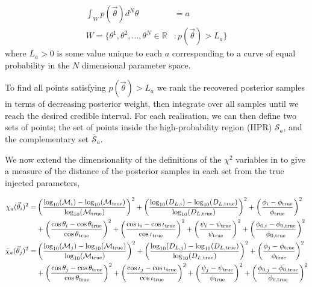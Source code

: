 \documentclass[prd,showpacs,nofootinbib]{revtex4}
\begin{document}
\begin{align}
\int_W p(\vec\theta )d^N\theta &= a \\\nonumber
W = \{\theta^1,\theta^2,\ldots,\theta^N\in\mathbb{R} &: p(\vec\theta )>L_a\}
\end{align}
where $L_a>0$ is some value unique to each $a$ corresponding to a curve of equal probability in the $N$ dimensional parameter space.

To find all points satisfying $p(\vec\theta )>L_a$  we rank the recovered posterior samples in terms of decreasing posterior weight, then integrate over all samples until we reach the desired credible interval. For each realisation, we can then define two sets of points; the set of points inside the high-probability region (HPR) $\mathcal{S}_a$, and the complementary set $\mathcal{\bar S}_a$.

We now extend the dimensionality of the definitions of the $\chi^2$ variables in \citep{ellis-first-order} to give a measure of the distance of the posterior samples in each set from the true injected parameters,

\begin{align}
\chi_a(\vec\theta_i)^2 =& \left(\frac{\log_{10}(\mathcal{M}_i)-\log_{10}(\mathcal{M}_{\rm true})}{\log_{10}(\mathcal{M}_{\rm true})}\right)^2 + \left(\frac{\log_{10}(D_{L,i})-\log_{10}(D_{L,\rm true})}{\log_{10}(D_{L,\rm true})}\right)^2 + \left(\frac{\phi_i-\phi_{\rm true}}{\phi_{\rm true}}\right)^2 \\\nonumber 
&+ \left(\frac{\cos\theta_i-\cos\theta_{\rm true}}{\cos\theta_{\rm true}}\right)^2 + \left(\frac{\cos\iota_i-\cos\iota_{\rm true}}{\cos\iota_{\rm true}}\right)^2 + \left(\frac{\psi_i-\psi_{\rm true}}{\psi_{\rm true}}\right)^2 + \left(\frac{\phi_{0,i}-\phi_{0,\rm true}}{\phi_{0,\rm true}}\right)^2 \\\nonumber
\bar\chi_a(\vec\theta_j)^2 =& \left(\frac{\log_{10}(\mathcal{M}_j)-\log_{10}(\mathcal{M}_{\rm true})}{\log_{10}(\mathcal{M}_{\rm true})}\right)^2 + \left(\frac{\log_{10}(D_{L,j})-\log_{10}(D_{L,\rm true})}{\log_{10}(D_{L,\rm true})}\right)^2 + \left(\frac{\phi_j-\phi_{\rm true}}{\phi_{\rm true}}\right)^2 \\\nonumber 
&+ \left(\frac{\cos\theta_j-\cos\theta_{\rm true}}{\cos\theta_{\rm true}}\right)^2 + \left(\frac{\cos\iota_j-\cos\iota_{\rm true}}{\cos\iota_{\rm true}}\right)^2 + \left(\frac{\psi_j-\psi_{\rm true}}{\psi_{\rm true}}\right)^2 + \left(\frac{\phi_{0,j}-\phi_{0,\rm true}}{\phi_{0,\rm true}}\right)^2 \\\nonumber
\end{align}
\end{document}
